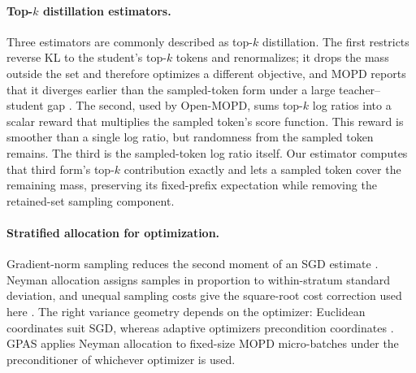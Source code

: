 \paragraph{Top-$k$ distillation estimators.}
Three estimators are commonly described as top-$k$ distillation. The first
restricts reverse KL to the student's top-$k$ tokens and renormalizes; it drops
the mass outside the set and therefore optimizes a different objective, and
MOPD reports that it diverges earlier than the sampled-token form under a large
teacher--student gap \citep{ma2026mopdmultiteacheronpolicydistillation}. The
second, used by Open-MOPD, sums top-$k$ log ratios into a scalar reward that
multiplies the sampled token's score function. This reward is smoother than a
single log ratio, but randomness from the sampled token remains. The third is
the sampled-token log ratio itself. Our estimator computes that third form's
top-$k$ contribution exactly and lets a sampled token cover the remaining
mass, preserving its fixed-prefix expectation while removing the retained-set
sampling component.

\paragraph{Stratified allocation for optimization.}
Gradient-norm sampling reduces the second moment of an SGD estimate
\citep{alain2015variancereductionsgddistributed,
katharopoulos2018samplescreatedequaldeep}. Neyman allocation assigns samples
in proportion to within-stratum standard deviation, and unequal sampling costs
give the square-root cost correction used here
\citep{neyman1934representative,cochran1977sampling,mohri2026costawarelearning}.
The right variance geometry depends on the optimizer: Euclidean coordinates
suit SGD, whereas adaptive optimizers precondition coordinates
\citep{lahire2023nonuniformadaptive}. GPAS applies Neyman allocation to
fixed-size MOPD micro-batches under the preconditioner of whichever optimizer
is used.
